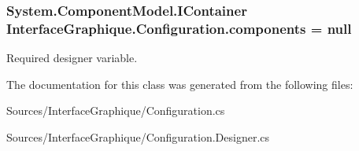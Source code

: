 \subsubsection[{\texorpdfstring{components}{components}}]{\setlength{\rightskip}{0pt plus 5cm}System.\+Component\+Model.\+I\+Container Interface\+Graphique.\+Configuration.\+components = null\hspace{0.3cm}{\ttfamily [private]}}\hypertarget{class_interface_graphique_1_1_configuration_a5aaae6baeb479c8a9b013cfb1ff58cda}{}\label{class_interface_graphique_1_1_configuration_a5aaae6baeb479c8a9b013cfb1ff58cda}


Required designer variable. 



The documentation for this class was generated from the following files\+:\begin{DoxyCompactItemize}
\item 
Sources/\+Interface\+Graphique/Configuration.\+cs\item 
Sources/\+Interface\+Graphique/Configuration.\+Designer.\+cs\end{DoxyCompactItemize}
